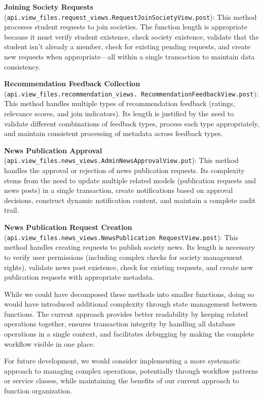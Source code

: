 \textbf{Joining Society Requests} (\texttt{api.view\_files.request\_views.RequestJoinSocietyView.post}):
This method processes student requests to join societies. The function length is appropriate because it must verify student existence, check society existence, validate that the student isn't already a member, check for existing pending requests, and create new requests when appropriate—all within a single transaction to maintain data consistency.

\textbf{Recommendation Feedback Collection} (\texttt{api.view\_files.recommendation\_views.
RecommendationFeedbackView.post}):
This method handles multiple types of recommendation feedback (ratings, relevance scores, and join indicators). Its length is justified by the need to validate different combinations of feedback types, process each type appropriately, and maintain consistent processing of metadata across feedback types.

\textbf{News Publication Approval} (\texttt{api.view\_files.news\_views.AdminNewsApprovalView.put}):
This method handles the approval or rejection of news publication requests. Its complexity stems from the need to update multiple related models (publication requests and news posts) in a single transaction, create notifications based on approval decisions, construct dynamic notification content, and maintain a complete audit trail.

\textbf{News Publication Request Creation} (\texttt{api.view\_files.news\_views.NewsPublication
RequestView.post}):
This method handles creating requests to publish society news. Its length is necessary to verify user permissions (including complex checks for society management rights), validate news post existence, check for existing requests, and create new publication requests with appropriate metadata.

While we could have decomposed these methods into smaller functions, doing so would have introduced additional complexity through state management between functions. The current approach provides better readability by keeping related operations together, ensures transaction integrity by handling all database operations in a single context, and facilitates debugging by making the complete workflow visible in one place.

For future development, we would consider implementing a more systematic approach to managing complex operations, potentially through workflow patterns or service classes, while maintaining the benefits of our current approach to function organization.

